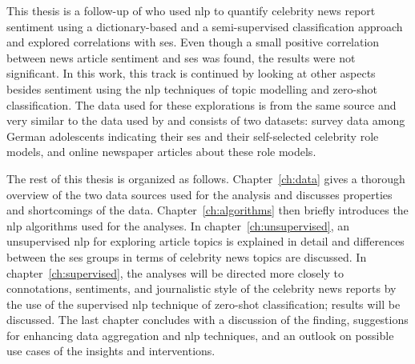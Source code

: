 This thesis is a follow-up of \textcite{fenske_using_2022} who used \gls{nlp} to quantify celebrity news report sentiment using a dictionary-based and a semi-supervised classification approach and explored correlations with \gls{ses}. Even though a small positive correlation between news article sentiment and \gls{ses} was found, the results were not significant. In this work, this track is continued by looking at other aspects besides sentiment using the \gls{nlp} techniques of topic modelling and zero-shot classification. The data used for these explorations is from the same source and very similar to the data used by \textcite{fenske_using_2022} and consists of two datasets: survey data among German adolescents indicating their \gls{ses} and their self-selected celebrity role models, and online newspaper articles about these role models.

The rest of this thesis is organized as follows. Chapter~\ref{ch:data} gives a thorough overview of the two data sources used for the analysis and discusses properties and shortcomings of the data. Chapter~\ref{ch:algorithms} then briefly introduces the \gls{nlp} algorithms used for the analyses. In chapter~\ref{ch:unsupervised}, an unsupervised \gls{nlp} for exploring article topics is explained in detail and differences between the \gls{ses} groups in terms of celebrity news topics are discussed. In chapter~\ref{ch:supervised}, the analyses will be directed more closely to connotations, sentiments, and journalistic style of the celebrity news reports by the use of the supervised \gls{nlp} technique of zero-shot classification; results will be discussed. The last chapter concludes with a discussion of the finding, suggestions for enhancing data aggregation and \gls{nlp} techniques, and an outlook on possible use cases of the insights and interventions.